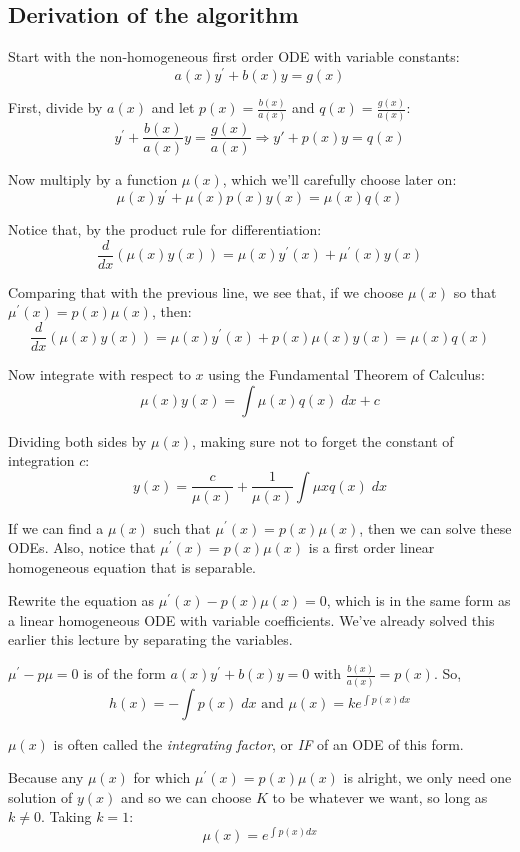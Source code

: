 \documentclass[11pt]{article}
\newcommand{\yp}{y^{\prime}}
\begin{document}
\subsection{Derivation of the algorithm}
	Start with the non-homogeneous first order ODE with variable constants:
		$$ a(x) \yp + b(x) y = g(x) $$

	First, divide by $a(x)$ and let $p(x) = \frac{b(x)}{a(x)}$ and $q(x) = \frac{g(x)}{a(x)}$:
		$$ \yp + \frac{b(x)}{a(x)} y = \frac{g(x)}{a(x)} \Rightarrow y' + p(x) y = q(x) $$

	Now multiply by a function $\mu (x)$, which we'll carefully choose later on:
		$$ \mu(x) \yp + \mu(x) p(x) y(x) = \mu(x) q(x) $$

	Notice that, by the product rule for differentiation:
		$$ \frac{d}{dx} (\mu(x) y(x)) = \mu(x) \yp(x) + \mu^{\prime}(x) y(x) $$

	Comparing that with the previous line, we see that, if we choose $\mu (x)$ so that $\mu^{\prime} (x) = p(x)\mu(x)$, then:
		$$ \frac{d}{dx} (\mu(x) y(x)) = \mu(x) \yp(x) + p(x) \mu(x) y(x) = \mu(x) q(x) $$

	Now integrate with respect to $x$ using the Fundamental Theorem of Calculus:
		$$ \mu(x) y(x) = \int \mu(x) q(x) \; dx + c $$

	Dividing both sides by $\mu(x)$, making sure not to forget the constant of integration $c$:
		$$ y(x) = \frac{c}{\mu(x)} + \frac{1}{\mu(x)} \int \mu{x} q(x) \; dx $$

	If we can find a $\mu(x)$ such that $\mu^{\prime} (x) = p(x) \mu(x)$, then we can solve these ODEs. Also, notice that $\mu^{\prime}(x) = p(x)\mu(x)$ is a first order linear homogeneous equation that is separable.

	Rewrite the equation as $\mu^{\prime}(x) - p(x) \mu (x) = 0$, which is in the same form as a linear homogeneous ODE with variable coefficients. We've already solved this earlier this lecture by separating the variables.

	$\mu^{\prime} - p \mu = 0$ is of the form $a(x) \yp + b(x) y = 0$ with $\frac{b(x)}{a(x)} = p(x)$. So,
		$$ h(x) = - \int p(x) \; dx \text{ and } \mu(x) = k e^{\int p(x) dx} $$

	$\mu (x)$ is often called the \emph{integrating factor}, or \emph{IF} of an ODE of this form.

	Because any $\mu(x)$ for which $\mu^{\prime}(x) = p(x)\mu(x)$ is alright, we only need one solution of $y(x)$ and so we can choose $K$ to be whatever we want, so long as $k \neq 0$. Taking $k=1$:
		$$ \mu(x) = e^{\int p(x) dx} $$
\end{document}

